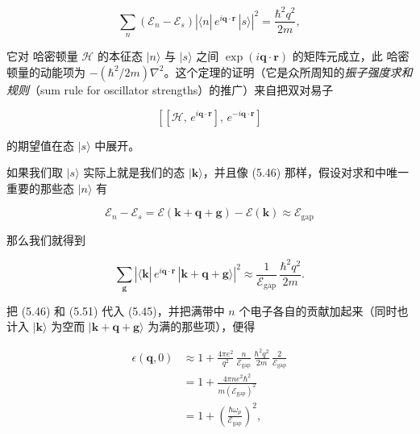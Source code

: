 \begin{equation*}
\sum_n \left( \mathcal{E}_n - \mathcal{E}_s \right) \left| \langle n|\, e^{i\mathbf{q}\cdot\mathbf{r}}\, |s\rangle \right|^2 = \frac{\hbar^2 q^2}{2m},
\tag{5.48}
\end{equation*}

它对 哈密顿量 $\mathcal{H}$ 的本征态 $|n\rangle$ 与 $|s\rangle$ 之间 $\exp(i\mathbf{q}\cdot\mathbf{r})$ 的矩阵元成立，此 哈密顿量的动能项为 $-(\hbar^2/2m)\nabla^2$。这个定理的证明（它是众所周知的\emph{振子强度求和规则}（sum rule for oscillator strengths）的推广）来自把双对易子

\begin{equation*}
\left[ \left[ \mathcal{H},\, e^{i\mathbf{q}\cdot\mathbf{r}} \right],\, e^{-i\mathbf{q}\cdot\mathbf{r}} \right]
\tag{5.49}
\end{equation*}

的期望值在态 $|s\rangle$ 中展开。

如果我们取 $|s\rangle$ 实际上就是我们的态 $|\mathbf{k}\rangle$，并且像 (5.46) 那样，假设对求和中唯一重要的那些态 $|n\rangle$ 有

\begin{equation*}
\mathcal{E}_n - \mathcal{E}_s = \mathcal{E}(\mathbf{k}+\mathbf{q}+\mathbf{g}) - \mathcal{E}(\mathbf{k}) \approx \mathcal{E}_{\mathrm{gap}}
\tag{5.50}
\end{equation*}

那么我们就得到

\begin{equation*}
\sum_{\mathbf{g}} \left| \langle \mathbf{k}|\, e^{i\mathbf{q}\cdot\mathbf{r}}\, |\mathbf{k}+\mathbf{q}+\mathbf{g}\rangle \right|^2 \approx \frac{1}{\mathcal{E}_{\mathrm{gap}}} \, \frac{\hbar^2 q^2}{2m} .
\tag{5.51}
\end{equation*}

把 (5.46) 和 (5.51) 代入 (5.45)，并把满带中 $n$ 个电子各自的贡献加起来（同时也计入 $|\mathbf{k}\rangle$ 为空而 $|\mathbf{k}+\mathbf{q}+\mathbf{g}\rangle$ 为满的那些项），便得

\begin{align*}
\epsilon(\mathbf{q},0) &\approx 1 + \frac{4\pi e^2}{q^2}\, \frac{n}{\mathcal{E}_{\mathrm{gap}}}\, \frac{\hbar^2 q^2}{2m}\, \frac{2}{\mathcal{E}_{\mathrm{gap}}} \\
&= 1 + \frac{4\pi n e^2 \hbar^2}{m\left(\mathcal{E}_{\mathrm{gap}}\right)^2} \\
&= 1 + \left( \frac{\hbar\omega_p}{\mathcal{E}_{\mathrm{gap}}} \right)^2 ,
\tag{5.52}
\end{align*}


